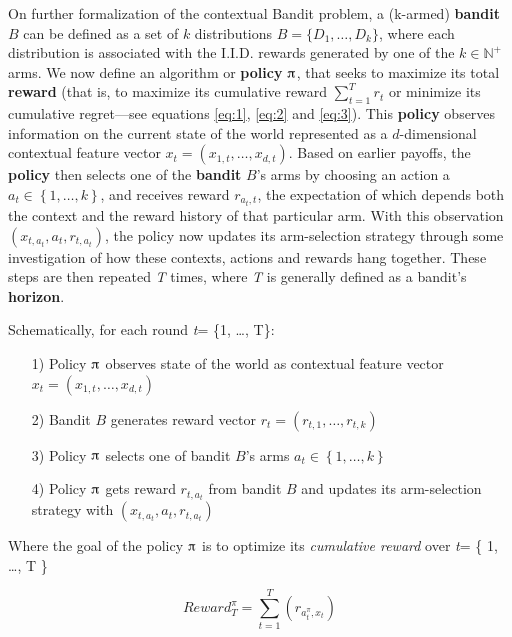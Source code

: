 \documentclass[nojss]{jss}\usepackage[]{graphicx}\usepackage[]{color}
\begin{document}
On further formalization of the contextual Bandit problem, a (k-armed) \textbf{bandit} $B$ can be defined as a set of $k$ distributions $B=\{D_{1},\dots ,D_{k}\}$, where each distribution is associated with the I.I.D. rewards generated by one of the $k\in \mathbb {N} ^{+}$ arms. We now define an algorithm or \textbf{policy} $\piup$, that seeks to maximize its total \textbf{reward} (that is, to maximize its cumulative reward $\sum_{t=1}^T r_t$ or minimize its cumulative regret---see equations \ref{eq:1}, \ref{eq:2} and \ref{eq:3}). This \textbf{policy} observes information on the current state of the world represented as a $d$-dimensional contextual feature vector \(x_{t}=\left( x_{1,t},  \dots, x_{d,t}\right)\). Based on earlier payoffs, the \textbf{policy} then selects one of the \textbf{bandit} $B$'s arms by choosing an action a \(a_{t} \in \left\{ 1, \dots, k \right\}\), and receives reward \(r_{a_{t},t}\), the expectation of which depends both the context and the reward history of that particular arm. With this observation \( (x_{t,a_t},a_{t},r_{t,a_t}) \), the policy now updates its arm-selection strategy through some investigation of how these contexts, actions and rewards hang together. These steps are then repeated \textit{T} times, where \textit{T} is generally defined as a bandit's \textbf{horizon}.

Schematically, for each round \emph{t}= \{1, \ldots, T\}:

\begin{enumerate}
         \item[1)] Policy $\piup$ observes state of the world as contextual feature vector \(x_{t}=\left( x_{1,t},  \dots, x_{d,t}\right)\)
         \item[2)] Bandit $B$ generates reward vector \(r_{t}=\left( r_{t,1},  \dots, r_{t,k}\right)\)
         \item[3)] Policy $\piup$ selects one of bandit $B$'s arms \(a_{t} \in \left\{ 1, \dots, k \right\}\)
         \item[4)] Policy $\piup$ gets reward \(r_{t,a_t}\) from bandit $B$ and updates its arm-selection strategy with \( (x_{t,a_t},a_{t},r_{t,a_t}) \)
\end{enumerate}

Where the goal of the policy $\piup$ is to optimize its \textit{cumulative reward} over \emph{t}= \{ 1, \ldots, T \}

\begin{equation} \label{eq:1}
Reward^{\pi}_{T} = \sum^{T}_{t=1}(r_{a^{\pi}_t,x_t})
\end{equation}
\end{document}
